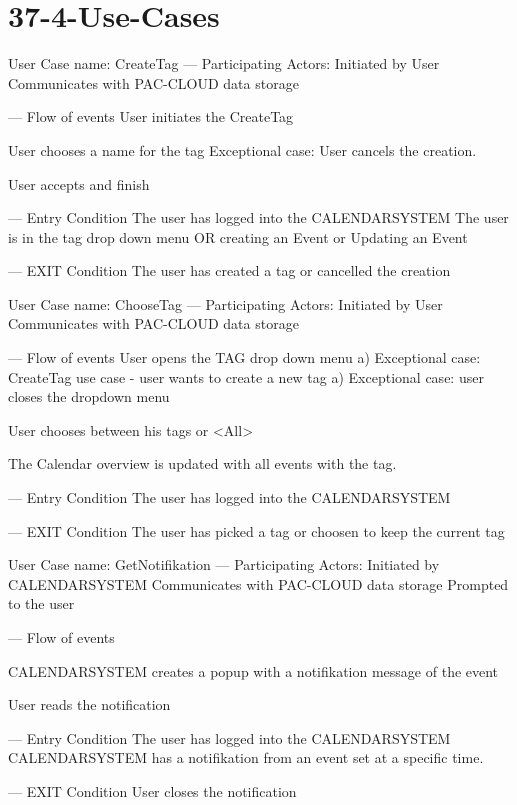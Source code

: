 \section{37-4-Use-Cases}
User Case name: CreateTag
---
Participating Actors:
Initiated by User
Communicates with PAC-CLOUD data storage

---
Flow of events
User initiates the CreateTag

User chooses a name for the tag
	Exceptional case: User cancels the creation.

User accepts and finish

---
Entry Condition
The user has logged into the CALENDARSYSTEM
The user is in the tag drop down menu OR creating an Event or Updating an Event

---
EXIT Condition
The user has created a tag or cancelled the creation



User Case name: ChooseTag
---
Participating Actors:
Initiated by User
Communicates with PAC-CLOUD data storage

---
Flow of events
User opens the TAG drop down menu
	a) Exceptional case: CreateTag use case - user wants to create a new tag
	a) Exceptional case: user closes the dropdown menu

User chooses between his tags or <All>
	
The Calendar overview is updated with all events with the tag.

---
Entry Condition
The user has logged into the CALENDARSYSTEM

---
EXIT Condition
The user has picked a tag or choosen to keep the current tag



User Case name: GetNotifikation
---
Participating Actors:
Initiated by CALENDARSYSTEM
Communicates with PAC-CLOUD data storage
Prompted to the user

---
Flow of events

CALENDARSYSTEM creates a popup with a notifikation message of the event

User reads the notification

---
Entry Condition
The user has logged into the CALENDARSYSTEM
CALENDARSYSTEM has a notifikation from an event set at a specific time.

---
EXIT Condition
User closes the notification